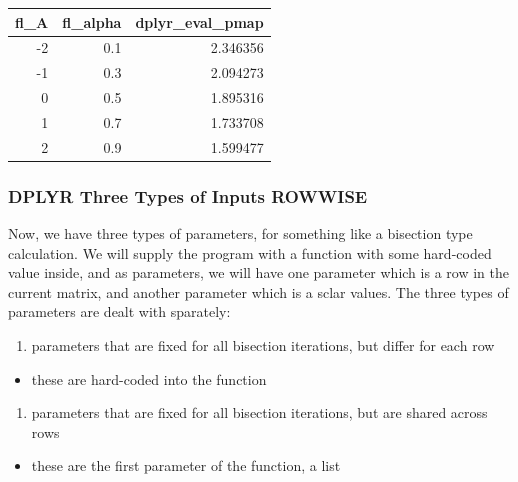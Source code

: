 \documentclass[
]{book}
\providecommand{\tightlist}{%
  \setlength{\itemsep}{0pt}\setlength{\parskip}{0pt}}
\begin{document}
\begin{table}[!h]
\centering
\begin{tabular}{r|r|r}
\hline
fl\_A & fl\_alpha & dplyr\_eval\_pmap\\
\hline
\rowcolor{gray!6}  -2 & 0.1 & 2.346356\\
\hline
-1 & 0.3 & 2.094273\\
\hline
\rowcolor{gray!6}  0 & 0.5 & 1.895316\\
\hline
1 & 0.7 & 1.733708\\
\hline
\rowcolor{gray!6}  2 & 0.9 & 1.599477\\
\hline
\end{tabular}
\end{table}

\hypertarget{dplyr-three-types-of-inputs-rowwise}{%
\subsubsection{DPLYR Three Types of Inputs ROWWISE}\label{dplyr-three-types-of-inputs-rowwise}}

Now, we have three types of parameters, for something like a bisection type calculation. We will supply the program with a function with some hard-coded value inside, and as parameters, we will have one parameter which is a row in the current matrix, and another parameter which is a sclar values. The three types of parameters are dealt with sparately:

\begin{enumerate}
\def\labelenumi{\arabic{enumi}.}
\tightlist
\item
  parameters that are fixed for all bisection iterations, but differ for each row
\end{enumerate}

\begin{itemize}
\tightlist
\item
  these are hard-coded into the function
\end{itemize}

\begin{enumerate}
\def\labelenumi{\arabic{enumi}.}
\setcounter{enumi}{1}
\tightlist
\item
  parameters that are fixed for all bisection iterations, but are shared across rows
\end{enumerate}

\begin{itemize}
\tightlist
\item
  these are the first parameter of the function, a list
\end{itemize}
\end{document}
